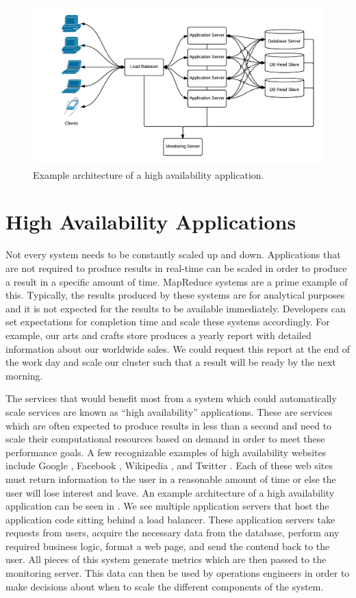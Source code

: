 \begin{figure}
\centering
\includegraphics[width=\textwidth]{diagrams/highavailability.png}
\caption{Example architecture of a high availability application.}
\label{fig:highavailability}
\end{figure}

\section{High Availability Applications}
Not every system needs to be constantly scaled up and down. Applications that are not required to produce results in real-time can be scaled in order to produce a result in a specific amount of time. MapReduce \cite{dean2008mapreduce} systems are a prime example of this. Typically, the results produced by these systems are for analytical purposes and it is not expected for the results to be available immediately. Developers can set expectations for completion time and scale these systems accordingly. For example, our arts and crafts store produces a yearly report with detailed information about our worldwide sales. We could request this report at the end of the work day and scale our cluster such that a result will be ready by the next morning.

The services that would benefit most from a system which could automatically scale services are known as ``high availability'' applications. These are services which are often expected to produce results in less than a second and need to scale their computational resources based on demand in order to meet these performance goals. A few recognizable examples of high availability websites include Google \cite{google}, Facebook \cite{facebook}, Wikipedia \cite{wikipedia}, and Twitter \cite{twitter}. Each of these web sites must return information to the user in a reasonable amount of time or else the user will lose interest and leave. An example architecture of a high availability application can be seen in . We see multiple application servers that host the application code sitting behind a load balancer. These application servers take requests from users, acquire the necessary data from the database, perform any required business logic, format a web page, and send the contend back to the user. All pieces of this system generate metrics which are then passed to the monitoring server. This data can then be used by operations engineers in order to make decisions about when to scale the different components of the system.

